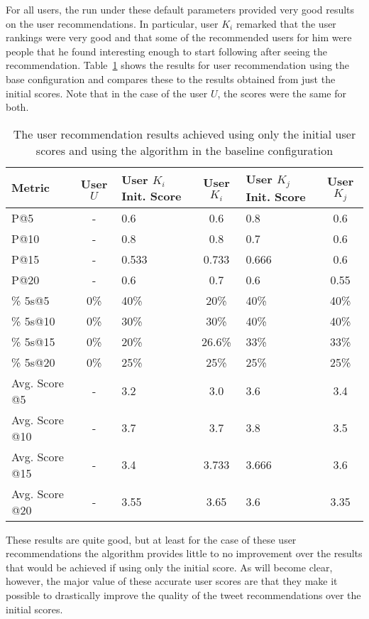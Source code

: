 For all users, the run under these default parameters provided very good results on the user recommendations. In particular, user $K_{i}$ remarked that the user rankings were very good and that some of the recommended users for him were people that he found interesting enough to start following after seeing the recommendation. Table~\ref{tab:BaseUserResults} shows the results for user recommendation using the base configuration and compares these to the results obtained from just the initial scores. Note that in the case of the user $U$, the scores were the same for both.


\begin{table}
\centering
\begin{tabular}{l|c|p{2.25cm}|c|p{2.25cm}|c}
{\bf Metric} & {\bf User $U$} & {\bf User $K_{i}$ Init. Score} & {\bf User $K_{i}$} & {\bf User $K_{j}$ Init. Score} & {\bf User $K_{j}$} \\ \hline
P@5   & - & 0.6 & 0.6 & 0.8 & 0.6 \\ \hline
P@10 & - & 0.8 & 0.8 & 0.7 & 0.6 \\ \hline
P@15 & - & 0.533 & 0.733 & 0.666 & 0.6 \\ \hline
P@20 & - & 0.6 & 0.7 & 0.6 & 0.55 \\ \hline

\% 5s@5    & 0\% & 40\% & 20\% & 40\% & 40\% \\ \hline
\% 5s@10  & 0\% & 30\% & 30\% & 40\% & 40\% \\ \hline
\% 5s@15  & 0\% & 20\% & 26.6\% & 33\% & 33\% \\ \hline
\% 5s@20  & 0\% & 25\% & 25\% & 25\% & 25\% \\ \hline

Avg. Score @5   & - & 3.2 & 3.0 & 3.6 & 3.4 \\ \hline
Avg. Score @10 & - & 3.7 & 3.7 & 3.8 & 3.5 \\ \hline
Avg. Score @15 & - & 3.4 & 3.733 & 3.666 & 3.6 \\ \hline
Avg. Score @20 & - & 3.55 & 3.65 & 3.6 & 3.35 \\
\end{tabular}
\caption{The user recommendation results achieved using only the initial user scores and using the algorithm in the baseline configuration}
\label{tab:BaseUserResults}
\end{table}



These results are quite good, but at least for the case of these user recommendations the algorithm provides little to no improvement over the results that would be achieved if using only the initial score. As will become clear, however, the major value of these accurate user scores are that they make it possible to drastically improve the quality of the tweet recommendations over the initial scores.



